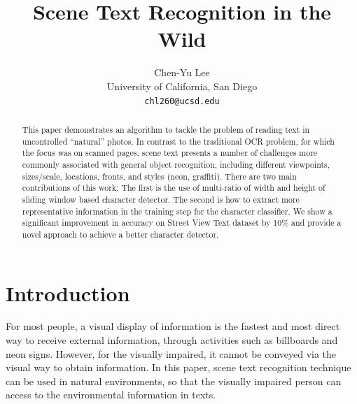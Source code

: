 \documentclass[10pt,twocolumn,letterpaper]{article}
\begin{document}
\title{Scene Text Recognition in the Wild}

\author{Chen-Yu Lee\\
University of California, San Diego\\
{\tt\small chl260@ucsd.edu}
}

\maketitle
\thispagestyle{empty}

\begin{abstract}
This paper demonstrates an algorithm to tackle the problem of reading text in uncontrolled ``natural'' photos. In contrast to the traditional OCR problem, for which the focus was on scanned pages, scene text presents a number of challenges more commonly associated with general object recognition, including different viewpoints, sizes/scale, locations, fronts, and styles (neon, graffiti). There are two main contributions of this work: The first is the use of multi-ratio of width and height of sliding window based character detector. The second is how to extract more representative information in the training step for the character classifier. We show a significant improvement in accuracy on Street View Text dataset by 10\% and provide a novel approach to achieve a better character detector.
\end{abstract}

\section{Introduction}

For most people, a visual display of information is the fastest and most direct way to receive external information, through activities such as billboards and neon signs. However, for the visually impaired, it cannot be conveyed via the visual way to obtain information. In this paper, scene text recognition technique can be used in natural environments, so that the visually impaired person can access to the environmental information in texts.
\end{document}
